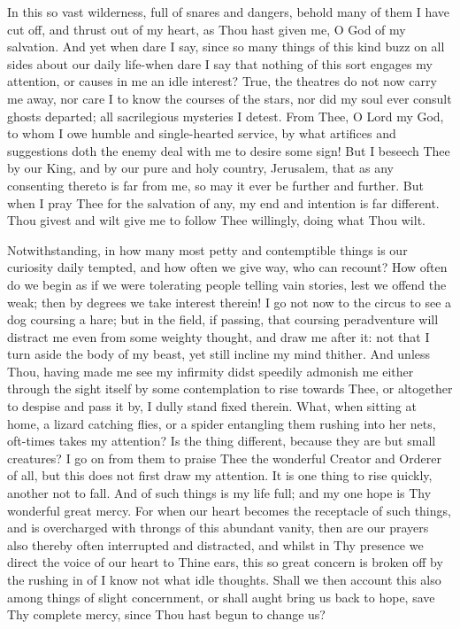 \documentclass[b5paper,openright,12pt,twoside]{book}
\begin{document}
In this so vast wilderness, full of snares and dangers, behold many of
them I have cut off, and thrust out of my heart, as Thou hast given me,
O God of my salvation. And yet when dare I say, since so many things of
this kind buzz on all sides about our daily life-when dare I say that
nothing of this sort engages my attention, or causes in me an idle
interest? True, the theatres do not now carry me away, nor care I to
know the courses of the stars, nor did my soul ever consult ghosts
departed; all sacrilegious mysteries I detest. From Thee, O Lord my God,
to whom I owe humble and single-hearted service, by what artifices
and suggestions doth the enemy deal with me to desire some sign! But I
beseech Thee by our King, and by our pure and holy country, Jerusalem,
that as any consenting thereto is far from me, so may it ever be further
and further. But when I pray Thee for the salvation of any, my end and
intention is far different. Thou givest and wilt give me to follow Thee
willingly, doing what Thou wilt.

Notwithstanding, in how many most petty and contemptible things is our
curiosity daily tempted, and how often we give way, who can recount? How
often do we begin as if we were tolerating people telling vain stories,
lest we offend the weak; then by degrees we take interest therein! I go
not now to the circus to see a dog coursing a hare; but in the field,
if passing, that coursing peradventure will distract me even from some
weighty thought, and draw me after it: not that I turn aside the body
of my beast, yet still incline my mind thither. And unless Thou, having
made me see my infirmity didst speedily admonish me either through the
sight itself by some contemplation to rise towards Thee, or altogether
to despise and pass it by, I dully stand fixed therein. What, when
sitting at home, a lizard catching flies, or a spider entangling them
rushing into her nets, oft-times takes my attention? Is the thing
different, because they are but small creatures? I go on from them to
praise Thee the wonderful Creator and Orderer of all, but this does not
first draw my attention. It is one thing to rise quickly, another not
to fall. And of such things is my life full; and my one hope is Thy
wonderful great mercy. For when our heart becomes the receptacle of such
things, and is overcharged with throngs of this abundant vanity, then
are our prayers also thereby often interrupted and distracted, and
whilst in Thy presence we direct the voice of our heart to Thine ears,
this so great concern is broken off by the rushing in of I know not what
idle thoughts. Shall we then account this also among things of slight
concernment, or shall aught bring us back to hope, save Thy complete
mercy, since Thou hast begun to change us?
\end{document}
